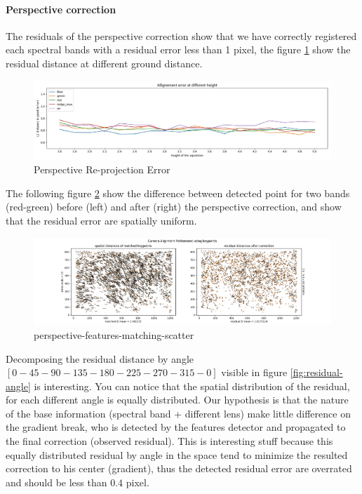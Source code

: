 \documentclass[]{elsarticle}
\begin{document}
	\paragraph{Perspective correction}
	The residuals of the perspective correction
	show that we have correctly registered each spectral bands with a residual error less than 1 pixel,
	the figure \ref{fig:perspective-error} show the residual distance at different ground distance.
	
	\begin{figure}[!htb]
		\centering
		\includegraphics[width=\linewidth]{../figures/prespective-allignement-rmse.jpg}
		\caption{Perspective Re-projection Error}
		\label{fig:perspective-error}
	\end{figure}
	
	The following figure \ref{fig:perspective-features-matching-scatter} show the difference between detected point for two bands (red-green)
	before (left) and after (right) the perspective correction, and show that the residual error are spatially uniform.
	
	\begin{figure}[!htb]
		\centering
		\includegraphics[width=\linewidth]{../figures/perspective-features-matching-scatter.png}
		\caption{perspective-features-matching-scatter}
		\label{fig:perspective-features-matching-scatter}
	\end{figure}
	
	Decomposing the residual distance by angle $[0-45-90-135-180-225-270-315-0]$ visible in figure \ref{fig:residual-angle} is interesting.
	You can notice that the spatial distribution of the residual, for each different angle is equally distributed.
	Our hypothesis is that the nature of the base information (spectral band + different lens) make little difference on the gradient break,
	who is detected by the features detector and propagated to the final correction (observed residual).
	This is interesting stuff because this equally distributed residual by angle in the space tend to minimize the resulted correction to his center (gradient),
	thus the detected residual error are overrated and should be less than $0.4$ pixel.
	
\end{document}
